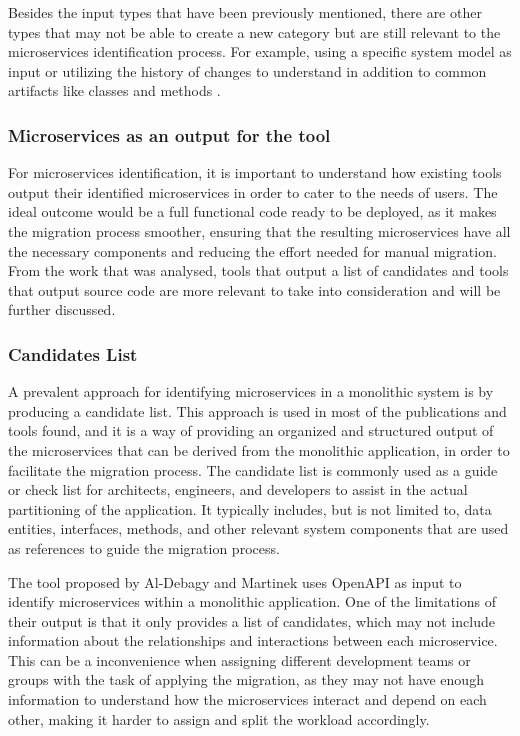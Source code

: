 \documentclass[conference]{IEEEtran}
\begin{document}
Besides the input types that have been previously mentioned, there are other
types that may not be able to create a new category but are still relevant to
the microservices identification process. For example, using a specific system
model as input  or utilizing the history of changes
to understand in addition to common artifacts like classes and methods
.

\subsubsection{Microservices as an output for the tool}

For microservices identification, it is important to understand how existing
tools output their identified microservices in order to cater to the needs of
users. The ideal outcome would be a full functional code ready to be deployed,
as it makes the migration process smoother, ensuring that the resulting
microservices have all the necessary components and reducing the effort needed
for manual migration. From the work that was analysed, tools that output a list
of candidates and tools that output source code are more relevant to take into
consideration and will be further discussed.

\subsubsection*{Candidates List}

A prevalent approach for identifying microservices in a monolithic system is by
producing a candidate list. This approach is used in most of the publications
and tools found, and it is a way of providing an organized and structured
output of the microservices that can be derived from the monolithic
application, in order to facilitate the migration process. The candidate list
is commonly used as a guide or check list for architects, engineers, and
developers to assist in the actual partitioning of the application. It
typically includes, but is not limited to, data entities, interfaces, methods,
and other relevant system components that are used as references to guide the
migration process.

The tool proposed by Al-Debagy and Martinek  uses OpenAPI as
input to identify microservices within a monolithic application. One of the
limitations of their output is that it only provides a list of candidates,
which may not include information about the relationships and interactions
between each microservice. This can be a inconvenience when assigning different
development teams or groups with the task of applying the migration, as they
may not have enough information to understand how the microservices interact
and depend on each other, making it harder to assign and split the workload
accordingly.
\end{document}
